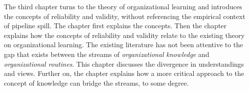 

The third chapter turns to the theory of organizational learning and introduces the concepts of reliability and validity, without referencing the empirical context of pipeline spill. The chapter first explains the concepts. Then the chapter explains how the concepts of reliability and validity relate to the existing theory on organizational learning. The existing literature has not been attentive to the gap that exists between the streams of \textit{organizational knowledge} and \textit{organizational routines}. This chapter discusses the divergence in understandings and views. Further on, the chapter explains how a more critical approach to the concept of knowledge can bridge the streams, to some degree.

